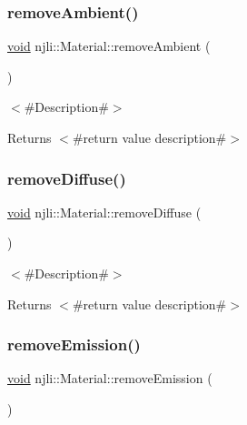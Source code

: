 \mbox{\label{classnjli_1_1_material_aca2f49d7b538a779edbf1b58573666b7}} 
\subsubsection{\texorpdfstring{remove\+Ambient()}{removeAmbient()}}
{\footnotesize\ttfamily \mbox{\hyperlink{_thread_8h_af1e856da2e658414cb2456cb6f7ebc66}{void}} njli\+::\+Material\+::remove\+Ambient (\begin{DoxyParamCaption}{ }\end{DoxyParamCaption})\hspace{0.3cm}{\ttfamily [protected]}}

$<$\#\+Description\#$>$

\begin{DoxyReturn}{Returns}
$<$\#return value description\#$>$ 
\end{DoxyReturn}
\mbox{\label{classnjli_1_1_material_a8f7886965c92fb212d58342f77055e47}} 
\subsubsection{\texorpdfstring{remove\+Diffuse()}{removeDiffuse()}}
{\footnotesize\ttfamily \mbox{\hyperlink{_thread_8h_af1e856da2e658414cb2456cb6f7ebc66}{void}} njli\+::\+Material\+::remove\+Diffuse (\begin{DoxyParamCaption}{ }\end{DoxyParamCaption})\hspace{0.3cm}{\ttfamily [protected]}}

$<$\#\+Description\#$>$

\begin{DoxyReturn}{Returns}
$<$\#return value description\#$>$ 
\end{DoxyReturn}
\mbox{\label{classnjli_1_1_material_af3b8bdf52a330ed4a0fcb5eca5bdb717}} 
\subsubsection{\texorpdfstring{remove\+Emission()}{removeEmission()}}
{\footnotesize\ttfamily \mbox{\hyperlink{_thread_8h_af1e856da2e658414cb2456cb6f7ebc66}{void}} njli\+::\+Material\+::remove\+Emission (\begin{DoxyParamCaption}{ }\end{DoxyParamCaption})\hspace{0.3cm}{\ttfamily [protected]}}

